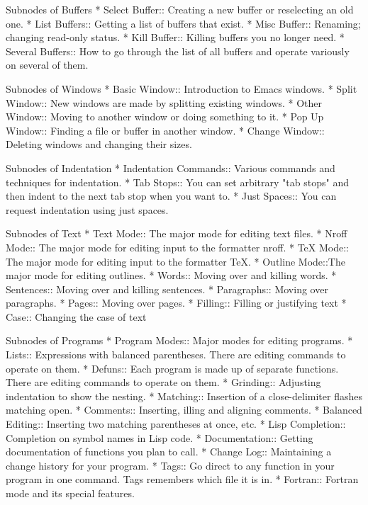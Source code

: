 Subnodes of Buffers
* Select Buffer::   Creating a new buffer or reselecting an old one.
* List Buffers::    Getting a list of buffers that exist.
* Misc Buffer::     Renaming; changing read-only status.
* Kill Buffer::     Killing buffers you no longer need.
* Several Buffers:: How to go through the list of all buffers
                     and operate variously on several of them.

Subnodes of Windows
* Basic Window::    Introduction to Emacs windows.
* Split Window::    New windows are made by splitting existing windows.
* Other Window::    Moving to another window or doing something to it.
* Pop Up Window::   Finding a file or buffer in another window.
* Change Window::   Deleting windows and changing their sizes.

Subnodes of Indentation
* Indentation Commands:: Various commands and techniques for indentation.
* Tab Stops::   You can set arbitrary "tab stops" and then
                 indent to the next tab stop when you want to.
* Just Spaces:: You can request indentation using just spaces.

Subnodes of Text
* Text Mode::   The major mode for editing text files.
* Nroff Mode::  The major mode for editing input to the formatter nroff.
* TeX Mode::    The major mode for editing input to the formatter TeX.
* Outline Mode::The major mode for editing outlines.
* Words::       Moving over and killing words.
* Sentences::   Moving over and killing sentences.
* Paragraphs::	Moving over paragraphs.
* Pages::	Moving over pages.
* Filling::     Filling or justifying text
* Case::        Changing the case of text

Subnodes of Programs
* Program Modes::       Major modes for editing programs.
* Lists::       Expressions with balanced parentheses.
                 There are editing commands to operate on them.
* Defuns::      Each program is made up of separate functions.
                 There are editing commands to operate on them.
* Grinding::    Adjusting indentation to show the nesting.
* Matching::    Insertion of a close-delimiter flashes matching open.
* Comments::    Inserting, illing and aligning comments.
* Balanced Editing::    Inserting two matching parentheses at once, etc.
* Lisp Completion::     Completion on symbol names in Lisp code.
* Documentation::       Getting documentation of functions you plan to call.
* Change Log::  Maintaining a change history for your program.
* Tags::        Go direct to any function in your program in one
                 command.  Tags remembers which file it is in.
* Fortran::	Fortran mode and its special features.

